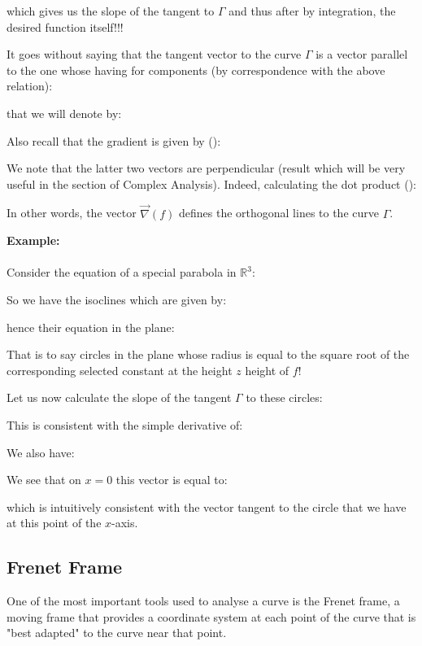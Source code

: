 {	which gives us the slope of the tangent to $\Gamma$ and thus after by integration, the desired function itself!!!
	
	It goes without saying that the tangent vector to the curve $\Gamma$ is a vector parallel to the one whose having for components (by correspondence with the above relation):
	
	that we will denote by:
	
	Also recall that the gradient is given by ():
	
	We note that the latter two vectors are perpendicular (result which will be very useful in the section of Complex Analysis). Indeed, calculating the dot product ():
	
	In other words, the vector $\vec{\nabla}(f)$ defines the orthogonal lines to the curve $\Gamma$.
	\begin{tcolorbox}[colframe=black,colback=white,sharp corners]
	\textbf{{\Large {}}Example:}\\\\
	Consider the equation of a special parabola in $\mathbb{R}^3$:
	
	So we have the isoclines which are given by:
	
	hence their equation in the plane:
	
	That is to say circles in the plane whose radius is equal to the square root of the corresponding selected constant at the height $z$ height of $f$!
	
	Let us now calculate the slope of the tangent $\Gamma$ to these circles:
	
	This is consistent with the simple derivative of:
	
	We also have:
	
	We see that on $x=0$ this vector is equal to:
	
	which is intuitively consistent with the vector tangent to the circle that we have at this point of the $x$-axis.
	\end{tcolorbox}
	
	\pagebreak
	\subsection{Frenet Frame}\label{frenet frame}
	One of the most important tools used to analyse a curve is the Frenet frame, a moving frame that provides a coordinate system at each point of the curve that is "best adapted" to the curve near that point.
	
}
